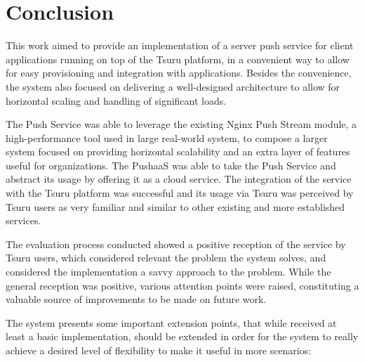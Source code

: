 \section{Conclusion} \label{section-conclusion}

This work aimed to provide an implementation of a server push service for client applications running on top of the Tsuru platform, in a convenient way to allow for easy provisioning and integration with applications. Besides the convenience, the system also focused on delivering a well-designed architecture to allow for horizontal scaling and handling of significant loads.

The Push Service was able to leverage the existing Nginx Push Stream module, a high-performance tool used in large real-world system, to compose a larger system focused on providing horizontal scalability and an extra layer of features useful for organizations. The PushaaS was able to take the Push Service and abstract its usage by offering it as a cloud service. The integration of the service with the Tsuru platform was successful and its usage via Tsuru was perceived by Tsuru users as very familiar and similar to other existing and more established services.

The evaluation process conducted showed a positive reception of the service by Tsuru users, which considered relevant the problem the system solves, and considered the implementation a savvy approach to the problem. While the general reception was positive, various attention points were raised, constituting a valuable source of improvements to be made on future work.

The system presents some important extension points, that while received at least a basic implementation, should be extended in order for the system to really achieve a desired level of flexibility to make it useful in more scenarios:

